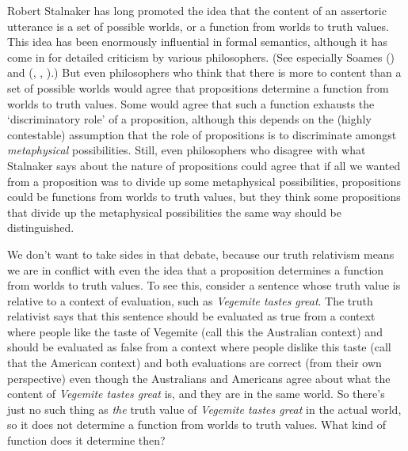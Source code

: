 \documentclass[
  11pt,
  letterpaper,
  DIV=11,
  numbers=noendperiod]{scrartcl}
\begin{document}
Robert Stalnaker has long promoted the idea that the content of an
assertoric utterance is a set of possible worlds, or a function from
worlds to truth values. This idea has been enormously influential in
formal semantics, although it has come in for detailed criticism by
various philosophers. (See especially Soames
() and (, , ).)
But even philosophers who think that there is more to content than a set
of possible worlds would agree that propositions determine a function
from worlds to truth values. Some would agree that such a function
exhausts the `discriminatory role' of a proposition, although this
depends on the (highly contestable) assumption that the role of
propositions is to discriminate amongst \emph{metaphysical}
possibilities. Still, even philosophers who disagree with what Stalnaker
says about the nature of propositions could agree that if all we wanted
from a proposition was to divide up some metaphysical possibilities,
propositions could be functions from worlds to truth values, but they
think some propositions that divide up the metaphysical possibilities
the same way should be distinguished.

We don't want to take sides in that debate, because our truth relativism
means we are in conflict with even the idea that a proposition
determines a function from worlds to truth values. To see this, consider
a sentence whose truth value is relative to a context of evaluation,
such as \emph{Vegemite tastes great}. The truth relativist says that
this sentence should be evaluated as true from a context where people
like the taste of Vegemite (call this the Australian context) and should
be evaluated as false from a context where people dislike this taste
(call that the American context) and both evaluations are correct (from
their own perspective) even though the Australians and Americans agree
about what the content of \emph{Vegemite tastes great} is, and they are
in the same world. So there's just no such thing as \emph{the} truth
value of \emph{Vegemite tastes great} in the actual world, so it does
not determine a function from worlds to truth values. What kind of
function does it determine then?
\end{document}
